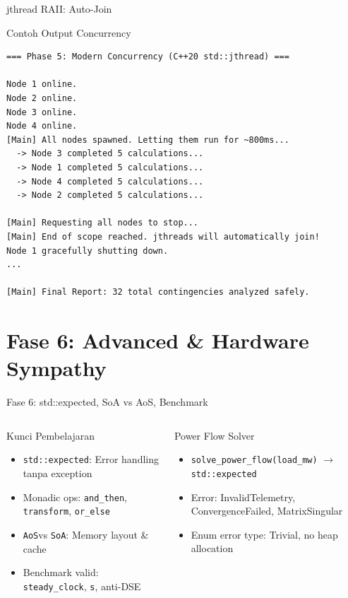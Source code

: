 \documentclass[aspectratio=169,10pt]{beamer}
\newcommand{\expected}{\texttt{std::expected}}
\newcommand{\AoS}{\texttt{AoS}}
\newcommand{\SoA}{\texttt{SoA}}
\begin{document}
\begin{frame}[fragile]{jthread RAII: Auto-Join}
  
\end{frame}

\begin{frame}[fragile]{Contoh Output Concurrency}
  \begin{verbatim}
=== Phase 5: Modern Concurrency (C++20 std::jthread) ===

Node 1 online.
Node 2 online.
Node 3 online.
Node 4 online.
[Main] All nodes spawned. Letting them run for ~800ms...
  -> Node 3 completed 5 calculations...
  -> Node 1 completed 5 calculations...
  -> Node 4 completed 5 calculations...
  -> Node 2 completed 5 calculations...

[Main] Requesting all nodes to stop...
[Main] End of scope reached. jthreads will automatically join!
Node 1 gracefully shutting down.
...

[Main] Final Report: 32 total contingencies analyzed safely.
  \end{verbatim}
\end{frame}

\section{Fase 6: Advanced \& Hardware Sympathy}

\begin{frame}{Fase 6: std::expected, SoA vs AoS, Benchmark}
  \begin{columns}[T]
    \begin{block}{Kunci Pembelajaran}
      \begin{itemize}
        \item \expected: Error handling tanpa exception
        \item Monadic ops: \texttt{and\_then}, \texttt{transform}, \texttt{or\_else}
        \item \AoS vs \SoA: Memory layout \& cache
        \item Benchmark valid: \texttt{steady\_clock}, \texttt{\textmu s}, anti-DSE
      \end{itemize}
    \end{block}
    \begin{exampleblock}{Power Flow Solver}
      \begin{itemize}
        \item \texttt{solve\_power\_flow(load\_mw)} $\rightarrow$ \expected
        \item Error: InvalidTelemetry, ConvergenceFailed, MatrixSingular
        \item Enum error type: Trivial, no heap allocation
      \end{itemize}
    \end{exampleblock}
  \end{columns}
\end{frame}
\end{document}
